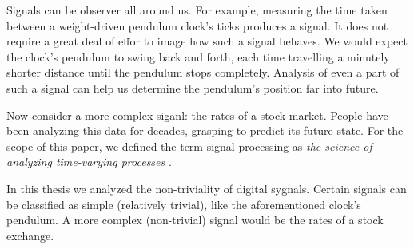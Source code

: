 Signals can be observer all around us. 
For example, measuring the time taken between a weight-driven
pendulum clock's ticks produces a signal. It does not require 
a great deal of effor to image how such a signal behaves.
We would expect the clock's pendulum to swing back and forth,
each time travelling a minutely shorter distance until the pendulum
stops completely. Analysis of even a part of such a signal can help 
us determine the pendulum's position far into future.


Now consider a more complex siganl: the rates of a stock market.
People have been analyzing this data for decades, grasping to 
predict its future state.
For the scope of this paper, we defined the term signal processing as
\textit{the science of analyzing time-varying processes} \cite{lyons2004understanding}.


In this thesis we analyzed the non-triviality of digital sygnals.
Certain signals can be classified as simple (relatively trivial),
like the aforementioned clock's pendulum.
A more complex (non-trivial) signal would be the rates of a stock exchange.